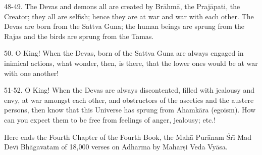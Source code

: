 48-49. The Devas and demons all are created by Br\=ahm\=a, the Praj\=apati, the Creator; they all are selfish; hence they are at war and war with each other. The Devas are born from the Sattva Guna; the human beings are sprung from the Rajas and the birds are sprung from the Tamas.

50. O King! When the Devas, born of the Sattva Guna are always engaged in inimical actions, what wonder, then, is there, that the lower ones would be at war with one another!

51-52. O King! When the Devas are always discontented, filled with jealousy and envy, at war amongst each other, and obstructors of the ascetics and the austere persons, then know that this Universe has sprung from Ahamk\=ara (egoism). How can you expect them to be free from feelings of anger, jealousy; etc.!

Here ends the Fourth Chapter of the Fourth Book, the Mah\=a Pur\=anam \'Sr\={\i} Mad Dev\={\i} Bh\=agavatam of 18,000 verses on Adharma by Mahar\d{s}i Veda Vy\=asa.




